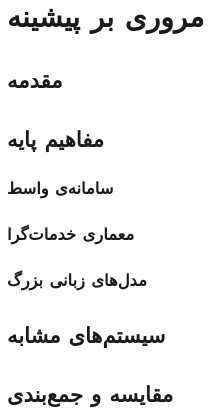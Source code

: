 \chapter{مروری بر پیشینه}
\label{ch:related}

\section{مقدمه}
\section{مفاهیم پایه}
\subsection{سامانه‌ی واسط }
\subsection{معماری خدمات‌گرا}
\subsection{مدل‌های زبانی بزرگ}
\section{سیستم‌های مشابه}
\subsection{}
\subsection{}
\subsection{}
\subsection{}
\section{مقایسه و جمع‌بندی}
